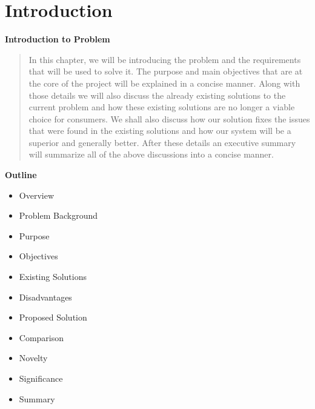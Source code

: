 \section{Introduction}

\vspace{20mm}

\Huge{\textbf{Introduction to Problem}}

\vspace{20mm}


\begin{abstract}
	In this chapter, we will be introducing the problem and the requirements that will be used to solve it. The purpose and main objectives that are at the core of the project will be explained in a concise manner. Along with those details we will also discuss the already existing solutions to the current problem and how these existing solutions are no longer a viable choice for consumers. We shall also discuss how our solution fixes the issues that were found in the existing solutions and how our system will be a superior and generally better. After these details an executive summary will summarize all of the above discussions into a concise manner.
\end{abstract}

\vspace{20mm}






\large{\textbf{Outline}}

\begin{center}
	\begin{itemize}
		
		\item Overview
		\item Problem Background
		\item Purpose
		\item Objectives
		\item Existing Solutions
		\item Disadvantages
		\item Proposed Solution
		\item Comparison
		\item Novelty
		\item Significance
		\item Summary
	\end{itemize}
\end{center}
\pagebreak








